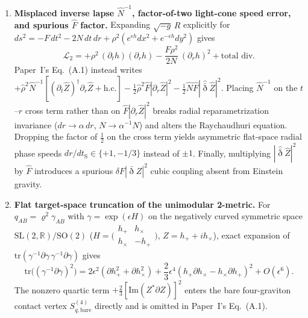 \documentclass[11pt]{article}
\newcommand{\bareth}{\bar{\eth}}
\begin{document}
\begin{enumerate}
\item \textbf{Misplaced inverse lapse $\widehat{N}^{-1}$, factor-of-two light-cone speed error, and spurious $\widehat{F}$ factor.} Expanding $\sqrt{-g}\,R$ explicitly for $ds^2 = -F\,dt^2 - 2N\,dt\,dr + \rho^2(e^{\epsilon h}dx^2 + e^{-\epsilon h}dy^2)$ gives
\begin{equation}\label{eq:exact_kin}
\mathcal{L}_2 = +\rho^2\,(\partial_t h)(\partial_r h) - \frac{F\rho^2}{2N}\,(\partial_r h)^2 + \text{total div.}
\end{equation}
Paper~I's Eq.~(A.1) instead writes $+\widehat{\rho}^2\widehat{N}^{-1}[(\partial_t\widehat{Z})^\dagger\partial_r\widehat{Z} + \mathrm{h.c.}] - \frac{1}{2}\widehat{\rho}^2\widehat{F}|\partial_r\widehat{Z}|^2 - \frac{1}{2}\widehat{N}\widehat{F}|\widehat{\bareth}\widehat{Z}|^2$. Placing $\widehat{N}^{-1}$ on the $t$--$r$ cross term rather than on $\widehat{F}|\partial_r\widehat{Z}|^2$ breaks radial reparametrization invariance ($dr\to\alpha\,dr$, $N\to\alpha^{-1}N$) and alters the Raychaudhuri equation. Dropping the factor of $\frac{1}{2}$ on the cross term yields asymmetric flat-space radial phase speeds $dr/dt_{\mathrm{S}} \in \{+1, -1/3\}$ instead of $\pm 1$. Finally, multiplying $|\widehat{\bareth}\widehat{Z}|^2$ by $\widehat{F}$ introduces a spurious $\delta F|\bareth Z|^2$ cubic coupling absent from Einstein gravity.

\item \textbf{Flat target-space truncation of the unimodular 2-metric.} For $q_{AB} = \varrho^2\gamma_{AB}$ with $\gamma = \exp(\epsilon H)$ on the negatively curved symmetric space $\mathrm{SL}(2,\mathbb{R})/\mathrm{SO}(2)$ ($H = \bigl(\begin{smallmatrix}h_+ & h_\times\\ h_\times & -h_+\end{smallmatrix}\bigr)$, $Z = h_+ + i h_\times$), exact expansion of $\mathrm{tr}(\gamma^{-1}\partial\gamma\,\gamma^{-1}\partial\gamma)$ gives
\begin{equation}\label{eq:sl2_quartic}
\mathrm{tr}\!\big((\gamma^{-1}\partial\gamma)^2\big) = 2\epsilon^2(\partial h_+^2 + \partial h_\times^2) + \frac{2}{3}\epsilon^4(h_+\partial h_\times - h_\times\partial h_+)^2 + O(\epsilon^6).
\end{equation}
The nonzero quartic term $+\frac{2}{3}[\mathrm{Im}(Z^*\partial Z)]^2$ enters the bare four-graviton contact vertex $S_{q,\mathrm{bare}}^{(4)}$ directly and is omitted in Paper~I's Eq.~(A.1).


\end{enumerate}
\end{document}
